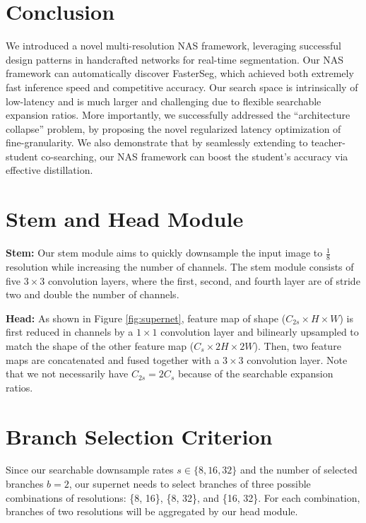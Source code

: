 \documentclass{article} \usepackage{iclr2020_conference,times}
\begin{document}
\section{Conclusion}\vspace{-0.5em}
We introduced a novel multi-resolution NAS framework, leveraging successful design patterns in handcrafted networks for real-time segmentation. Our NAS framework can automatically discover FasterSeg, which achieved both extremely fast inference speed and competitive accuracy. Our search space is intrinsically of low-latency and is much larger and challenging due to flexible searchable expansion ratios. More importantly, we successfully addressed the ``architecture collapse'' problem, by proposing the novel regularized latency optimization of fine-granularity. We also demonstrate that by seamlessly extending to teacher-student co-searching, our NAS framework can boost the student's accuracy via effective distillation.




\newpage
\appendix

\section{Stem and Head Module}\vspace{-0.7em}
\textbf{Stem:} Our stem module aims to quickly downsample the input image to $\frac{1}{8}$ resolution while increasing the number of channels. The stem module consists of five $3\times3$ convolution layers, where the first, second, and fourth layer are of stride two and double the number of channels.

\textbf{Head:} As shown in Figure \ref{fig:supernet}, feature map of shape ($C_{2s}\times H\times W$) is first reduced in channels by a $1\times1$ convolution layer and bilinearly upsampled to match the shape of the other feature map ($C_s \times 2H \times 2W$). Then, two feature maps are concatenated and fused together with a $3\times3$ convolution layer. Note that we not necessarily have $C_{2s} = 2C_{s}$ because of the searchable expansion ratios.


\section{Branch Selection Criterion}\vspace{-0.7em} \label{app:branch_selection_mnasnet}
Since our searchable downsample rates $s \in \{8, 16, 32\}$ and the number of selected branches $b = 2$, our supernet needs to select branches of three possible combinations of resolutions: \{8, 16\}, \{8, 32\}, and \{16, 32\}. For each combination, branches of two resolutions will be aggregated by our head module.
\end{document}
